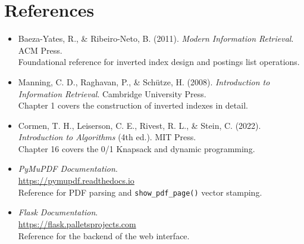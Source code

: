 \documentclass[10pt]{article}
\begin{document}
\section{References}

\begin{itemize}

\item Baeza-Yates, R., \& Ribeiro-Neto, B. (2011).
\textit{Modern Information Retrieval}. ACM Press. \\
Foundational reference for inverted index design and postings list operations.

\item Manning, C. D., Raghavan, P., \& Sch\"utze, H. (2008).
\textit{Introduction to Information Retrieval}. Cambridge University Press. \\
Chapter 1 covers the construction of inverted indexes in detail.

\item Cormen, T. H., Leiserson, C. E., Rivest, R. L., \& Stein, C. (2022).
\textit{Introduction to Algorithms} (4th ed.). MIT Press. \\
Chapter 16 covers the 0/1 Knapsack and dynamic programming.

\item \textit{PyMuPDF Documentation}. \\
\url{https://pymupdf.readthedocs.io} \\
Reference for PDF parsing and \texttt{show\_pdf\_page()} vector stamping.

\item \textit{Flask Documentation}. \\
\url{https://flask.palletsprojects.com} \\
Reference for the backend of the web interface.

\end{itemize}
\end{document}
